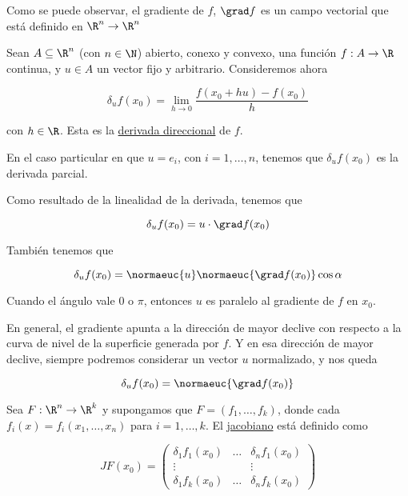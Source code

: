Como se puede observar, el gradiente de $f$, $\grad f$ es un campo vectorial que está definido en $\R^n \rightarrow \R^n$

\begin{defn}
    Sean $A \subseteq \R^n$ (con $n \in \N$) abierto, conexo y convexo, una función $f: A \rightarrow \R$ continua, y $u \in A$ un vector fijo y arbitrario. Consideremos ahora
    
    \[
    \delta_u f(x_0) = \lim_{h \to 0} \frac{f(x_0 + hu) - f(x_0)}{h}
    \]
    
    \noindent con $h \in \R$. Esta es la \ul{derivada direccional} de $f$.
\end{defn}

En el caso particular en que $u = e_i$, con $i = 1, \dots, n$, tenemos que $\delta_u f(x_0)$ es la derivada parcial.

\begin{prop}
    Como resultado de la linealidad de la derivada, tenemos que
    
    \[
    \delta_u f(x_0) = u \cdot \grad f(x_0)
    \]
    
    También tenemos que
    
    \[
    \delta_u f(x_0) = \normaeuc{u} \normaeuc{\grad f(x_0)} \cos \alpha
    \]
    
    Cuando el ángulo vale $0$ o $\pi$, entonces $u$ es paralelo al gradiente de $f$ en $x_0$.
    
    En general, el gradiente apunta a la dirección de mayor declive con respecto a la curva de nivel de la superficie generada por $f$. Y en esa dirección de mayor declive, siempre podremos considerar un vector $u$ normalizado, y nos queda
    
    \[
    \delta_u f(x_0) = \normaeuc{\grad f(x_0)}
    \]
\end{prop}

\begin{defn}
    Sea $F: \R^n \rightarrow \R^k$ y supongamos que $F = (f_1, \dots, f_k)$, donde cada $f_i(x) = f_i(x_1, \dots, x_n)$ para $i = 1, \dots, k$. El \ul{jacobiano} está definido como
    
    \[
    JF(x_0) =
    \begin{pmatrix}
        \delta_1 f_1(x_0) & \dots & \delta_n f_1(x_0) \\
        \vdots & & \vdots \\
        \delta_1 f_k(x_0) & \dots & \delta_n f_k(x_0)
    \end{pmatrix}
    \]
\end{defn}

